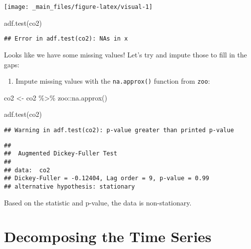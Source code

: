 \documentclass[
]{book}
\newenvironment{Shaded}{\begin{snugshade}}{\end{snugshade}}
\newcommand{\FunctionTok}[1]{\textcolor[rgb]{0.00,0.00,0.00}{#1}}
\newcommand{\NormalTok}[1]{#1}
\newcommand{\OtherTok}[1]{\textcolor[rgb]{0.56,0.35,0.01}{#1}}
\newcommand{\SpecialCharTok}[1]{\textcolor[rgb]{0.00,0.00,0.00}{#1}}
\providecommand{\tightlist}{%
  \setlength{\itemsep}{0pt}\setlength{\parskip}{0pt}}
\begin{document}
\begin{center}\texttt{[image: \_main\_files/figure-latex/visual-1]} \end{center}

\begin{Shaded}
\begin{Highlighting}[]
\FunctionTok{adf.test}\NormalTok{(co2)}
\end{Highlighting}
\end{Shaded}

\begin{verbatim}
## Error in adf.test(co2): NAs in x
\end{verbatim}

Looks like we have some missing values! Let's try and impute those to fill in the gaps:

\begin{enumerate}
\def\labelenumi{\arabic{enumi}.}
\setcounter{enumi}{1}
\tightlist
\item
  Impute missing values with the \texttt{na.approx()} function from \texttt{zoo}:
\end{enumerate}

\begin{Shaded}
\begin{Highlighting}[]
\NormalTok{co2 }\OtherTok{\textless{}{-}}\NormalTok{ co2 }\SpecialCharTok{\%\textgreater{}\%} 
\NormalTok{  zoo}\SpecialCharTok{::}\FunctionTok{na.approx}\NormalTok{()}

\FunctionTok{adf.test}\NormalTok{(co2)}
\end{Highlighting}
\end{Shaded}

\begin{verbatim}
## Warning in adf.test(co2): p-value greater than printed p-value
\end{verbatim}

\begin{verbatim}
## 
##  Augmented Dickey-Fuller Test
## 
## data:  co2
## Dickey-Fuller = -0.12404, Lag order = 9, p-value = 0.99
## alternative hypothesis: stationary
\end{verbatim}

Based on the statistic and p-value, the data is non-stationary.

\hypertarget{decomposing-the-time-series}{%
\section{Decomposing the Time Series}\label{decomposing-the-time-series}}
\end{document}
